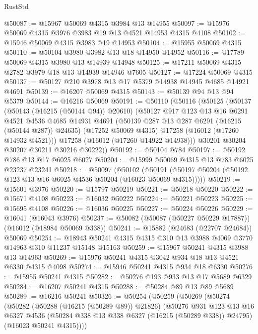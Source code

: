 \begin{lexlean}{RustStd}
\begin{coremodule}
@50087 := @15967 @50069 @4315 @3984 @13 @14955
@50097 := @15976 @50069 @4315 @3976 @3983 @19 @13 @4521 @14953 @4315 @4108
@50102 := @15946 @50069 @4315 @3983 @19 @14953
@50104 := @15955 @50069 @4315
@50110 := @50104 @3980 @3982 @13 @18 @14950 @14952
@50116 := @17789 @50069 @4315 @3980 @13 @14939 @14948
@50125 := @17211 @50069 @4315 @2782 @3979 @18 @13 @14939 @14946 @7605
@50127 := @17224 @50069 @4315
@50137 := @50127 @210 @3978 @13 @17 @5379 @14938 @14945 @4685 @14921 @4691
@50139 := @16207 @50069 @4315
@50143 := @50139 @94 @13 @94 @5379
@50144 := @16216 @50069
@50191 := @50110
    (@50116
      (@50125
        (@50137
          (@50143 (@16215 (@50144 @94)) @20610)
          (@50127
            @917
            @123
            @13
            @16
            @6291
            @4521
            @4536
            @4685
            @14931
            @4691
            (@50139 @287 @13 @287 @6291 (@16215 (@50144 @287)) @24635)
            (@17252 @50069 @4315)
            @17258
            (@16012 (@17260 @14932 @4521)))
          @17258
          (@16012 (@17260 @14922 @14938)))
        @30201
        @30204
        @30207
        @30211
        @30216
        @30222))
@50192 := @50104 @784
@50197 := @50192 @786 @13 @17 @6025 @6027
@50204 := @15999 @50069 @4315 @13 @783 @6025 @23237 @23241
@50218 := @50097
    (@50102 (@50191 (@50197 @50204 (@50192 @123 @13 @16 @6025 @4536 @50204 (@16023 @50069 @4315)))))
@50219 := @15601 @3976
@50220 := @15797 @50219
@50221 := @50218 @50220
@50222 := @15671 @4108
@50223 := @16032 @50222
@50224 := @50221 @50223
@50225 := @15695 @4108
@50226 := @16036 @50225
@50227 := @50224 @50226
@50229 := @16041 (@16043 @3976)
@50237 := @50082 (@50087 (@50227 @50229 @17887)) (@16012 (@18984 @50069 @338))
@50241 := @15882 (@24683 (@22707 @24684)) @50069
@50254 := @18943 @50241 @4315 @4315 @310 @13 @3988 @4069 @3770 @14963 @310 @11237 @15148 @15163
@50259 := @15967 @50241 @4315 @3988 @13 @14963
@50269 := @15976 @50241 @4315 @3042 @934 @18 @13 @4521 @6330 @4315 @4098
@50274 := @15946 @50241 @4315 @934 @18 @6330
@50276 := @15955 @50241 @4315
@50282 := @50276 @193 @933 @13 @17 @5689 @6329
@50284 := @16207 @50241 @4315
@50288 := @50284 @89 @13 @89 @5689
@50289 := @16216 @50241
@50326 := @50254
    (@50259
      (@50269
        (@50274
          (@50282
            (@50288 (@16215 (@50289 @89)) @21826)
            (@50276
              @931
              @123
              @13
              @16
              @6327
              @4536
              (@50284 @338 @13 @338 @6327 (@16215 (@50289 @338)) @24795)
              (@16023 @50241 @4315))))

\end{coremodule}
\end{lexlean}
